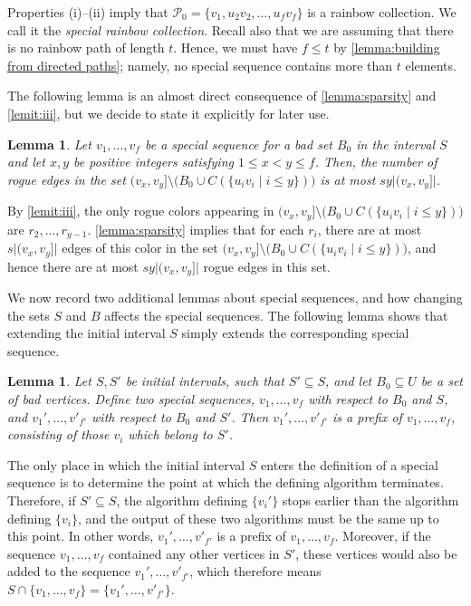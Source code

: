 \documentclass[a4paper,11pt]{article}
\makeatletter
\renewenvironment{proof}[1][\proofname] {\par\pushQED{\qed}\normalfont\topsep6\p@\@plus6\p@\relax\trivlist\item[\hskip\labelsep\bfseries#1\@addpunct{.}]\ignorespaces}{\popQED\endtrivlist\@endpefalse}
\newtheorem{lemma}[theorem]{\bf Lemma}
\theoremstyle{definition}
\def\cP{\mathcal{P}}
\makeatother
\begin{document}
Properties (i)--(ii) imply that $\cP_0=\{v_1, u_2v_2, \dots, u_fv_f\}$ is a rainbow collection. 
We call it the {\em special rainbow collection}.
Recall also that we are assuming that there is no rainbow path of length $t$. 
Hence, we must have $f \leq t$ by \cref{lemma:building from directed paths}; namely, no special sequence contains more than $t$ elements.

The following lemma is an almost direct consequence of \cref{lemma:sparsity} and \cref{lemit:iii}, but we decide to state it explicitly for later use.

\begin{lemma}\label{lemma:rogue edges special sequence}
Let $v_1, \dots, v_f$ be a special sequence for a bad set $B_0$ in the interval $S$ and let $x, y$ be positive integers satisfying $1\leq x<y\leq f$. Then, the number of rogue edges in the set $(v_x, v_y]\setminus \Big(B_0\cup C(\{u_iv_i\mid i\leq y\})\Big)$ is at most $sy \big|(v_x, v_y]\big|$.
\end{lemma}
\begin{proof}
By \cref{lemit:iii}, the only rogue colors appearing in $(v_x, v_y]\setminus \Big(B_0\cup C(\{u_iv_i\mid i\leq y\})\Big)$ are $r_2, \dots, r_{y-1}$. \cref{lemma:sparsity} implies that for each $r_i$, there are at most $s\big|(v_x, v_y]\big|$ edges of this color in the set $(v_x, v_y]\setminus \Big(B_0\cup C(\{u_iv_i\mid i\leq y\})\Big)$, and hence there are at most $sy\big|(v_x, v_y]\big|$ rogue edges in this set.
\end{proof}

We now record two additional lemmas about special sequences, and how changing the sets $S$ and $B$ affects the special sequences. The following lemma shows that extending the initial interval $S$ simply extends the corresponding special sequence.

\begin{lemma}\label{lemma:special sequence on different intervals}
Let $S, S'$ be initial intervals, such that $S'\subseteq S$, and let $B_0\subseteq U$ be a set of bad vertices. Define two special sequences, $v_1, \dots, v_f$ with respect to $B_0$ and $S$, and $v_1', \dots, v'_{f'}$ with respect to $B_0$ and $S'$. Then $v_1', \dots, v'_{f'}$ is a prefix of $v_1, \dots, v_f$, consisting of those $v_i$ which belong to $S'$. 
\end{lemma}
\begin{proof}
The only place in which the initial interval $S$ enters the definition of a special sequence is to determine the point at which the defining algorithm terminates. Therefore, if $S'\subseteq S$, the algorithm defining $\{v_i'\}$ stops earlier than the algorithm defining $\{v_i\}$, and the output of these two algorithms must be the same up to this point. In other words, $v_1', \dots, v'_{f'}$ is a prefix of $v_1, \dots, v_{f}$. Moreover, if the sequence $v_1, \dots, v_{f}$ contained any other vertices in $S'$, these vertices would also be added to the sequence $v_1', \dots, v'_{f'}$, which therefore means $S\cap\{v_1, \dots, v_f\}=\{v_1', \dots, v'_{f'}\}$. 
\end{proof}
\end{document}
